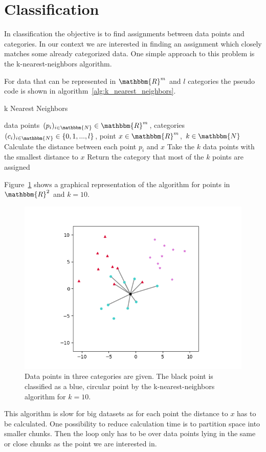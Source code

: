 \newpage

\section{Classification}
\label{sec:classification}

In classification the objective is to find assignments between data points and categories. In our context we are interested in finding an assignment which closely matches some already categorized data. One simple approach to this problem is the k-nearest-neighbors algorithm.

For data that can be represented in $\mathbbm{R}^m$ and $l$ categories the pseudo code is shown in algorithm~\ref{alg:k_nearest_neighbors}.

\begin{algorithm}
	\caption{k Nearest Neighbors}\label{alg:k_nearest_neighbors}
	\begin{algorithmic}
		\Require data points $(p_i)_{i \in \mathbbm{N}} \in \mathbbm{R}^{m}$, categories $(c_i)_{i \in \mathbbm{N}} \in \{0, 1, ..., l\}$, point $x \in \mathbbm{R}^{m}$, $k \in \mathbbm{N}$
		\State Calculate the distance between each point $p_i$ and $x$
		\State Take the $k$ data points with the smallest distance to $x$
		\State Return the category that most of the $k$ points are assigned
	\end{algorithmic}
\end{algorithm}

Figure~\ref{fig:k_nearest_neighbors} shows a graphical representation of the algorithm for points in $\mathbbm{R}^2$ and $k=10$.

\begin{figure}
	\centering
	\includegraphics[width=0.8\linewidth]{figs/k_nearest_neighbors}
	\caption{Data points in three categories are given. The black point is classified as a blue, circular point by the k-nearest-neighbors algorithm for $k=10$.}
	\label{fig:k_nearest_neighbors}
\end{figure}

This algorithm is slow for big datasets as for each point the distance to $x$ has to be calculated. One possibility to reduce calculation time is to partition space into smaller chunks. Then the loop only has to be over data points lying in the same or close chunks as the point we are interested in.
